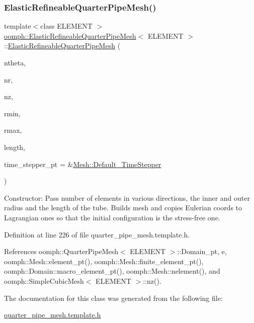 \subsubsection{\texorpdfstring{Elastic\+Refineable\+Quarter\+Pipe\+Mesh()}{ElasticRefineableQuarterPipeMesh()}}
{\footnotesize\ttfamily template$<$class E\+L\+E\+M\+E\+NT $>$ \\
\hyperlink{classoomph_1_1ElasticRefineableQuarterPipeMesh}{oomph\+::\+Elastic\+Refineable\+Quarter\+Pipe\+Mesh}$<$ E\+L\+E\+M\+E\+NT $>$\+::\hyperlink{classoomph_1_1ElasticRefineableQuarterPipeMesh}{Elastic\+Refineable\+Quarter\+Pipe\+Mesh} (\begin{DoxyParamCaption}\item[{const unsigned \&}]{ntheta,  }\item[{const unsigned \&}]{nr,  }\item[{const unsigned \&}]{nz,  }\item[{const double \&}]{rmin,  }\item[{const double \&}]{rmax,  }\item[{const double \&}]{length,  }\item[{\hyperlink{classoomph_1_1TimeStepper}{Time\+Stepper} $\ast$}]{time\+\_\+stepper\+\_\+pt = {\ttfamily \&\hyperlink{classoomph_1_1Mesh_a12243d0fee2b1fcee729ee5a4777ea10}{Mesh\+::\+Default\+\_\+\+Time\+Stepper}} }\end{DoxyParamCaption})\hspace{0.3cm}{\ttfamily [inline]}}



Constructor\+: Pass number of elements in various directions, the inner and outer radius and the length of the tube. Builds mesh and copies Eulerian coords to Lagrangian ones so that the initial configuration is the stress-\/free one. 



Definition at line 226 of file quarter\+\_\+pipe\+\_\+mesh.\+template.\+h.



References oomph\+::\+Quarter\+Pipe\+Mesh$<$ E\+L\+E\+M\+E\+N\+T $>$\+::\+Domain\+\_\+pt, e, oomph\+::\+Mesh\+::element\+\_\+pt(), oomph\+::\+Mesh\+::finite\+\_\+element\+\_\+pt(), oomph\+::\+Domain\+::macro\+\_\+element\+\_\+pt(), oomph\+::\+Mesh\+::nelement(), and oomph\+::\+Simple\+Cubic\+Mesh$<$ E\+L\+E\+M\+E\+N\+T $>$\+::nz().



The documentation for this class was generated from the following file\+:\begin{DoxyCompactItemize}
\item 
\hyperlink{quarter__pipe__mesh_8template_8h}{quarter\+\_\+pipe\+\_\+mesh.\+template.\+h}\end{DoxyCompactItemize}
